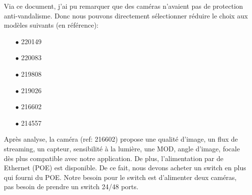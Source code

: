 \documentclass[12pt, french]{report}
\begin{document}
Via ce document, j'ai pu remarquer que des caméras n'avaient pas de protection anti-vandalisme. Donc nous pouvons directement sélectionner réduire le choix aux modèles suivants (en référence): \begin{itemize}
    \item[$\bullet$] 220149
    \item[$\bullet$] 220083
    \item[$\bullet$] 219808
    \item[$\bullet$] 219026
    \item[$\bullet$] 216602
    \item[$\bullet$] 214557\\
\end{itemize}

Après analyse, la caméra (ref: 216602) propose  une qualité d'image, un flux de streaming, un capteur, sensibilité à la lumière, une MOD, angle d'image, focale dès plus compatible avec notre application. De plus, l'alimentation par de Ethernet (POE) est disponible. De ce fait, nous devons acheter un switch en plus qui fourni du POE. Notre besoin pour le switch est d'alimenter deux caméras, pas besoin de prendre un switch 24/48 ports.
\end{document}
